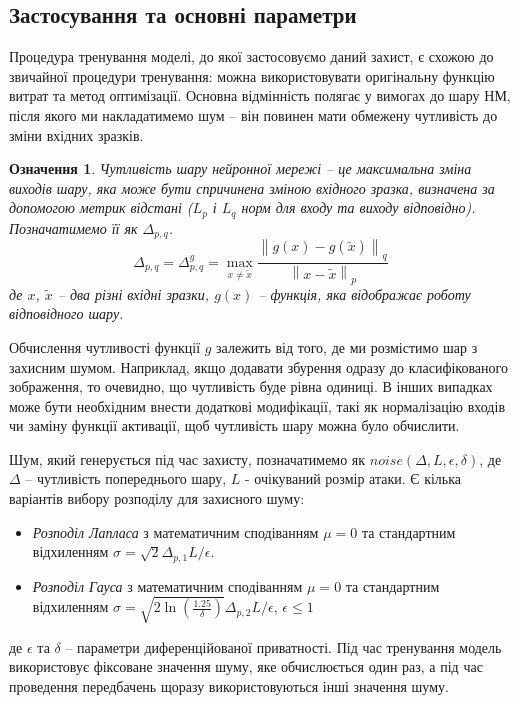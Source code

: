 \documentclass[14pt,a4paper]{extarticle}
\newcounter{e}
\newtheorem{defn}[theorem]{Означення}
\numberwithin{equation}{section}
\numberwithin{figure}{section}
\begin{document}
 \subsection{Застосування та основні параметри}
 Процедура тренування моделі, до якої застосовуємо даний захист, є схожою до звичайної процедури тренування: можна використовувати оригінальну функцію витрат та метод оптимізації. Основна відмінність полягає у вимогах до шару НМ, після якого ми накладатимемо шум -- він повинен мати обмежену чутливість до зміни вхідних зразків.
 
 \begin{defn} Чутливість шару нейронної мережі -- це максимальна зміна виходів шару, яка може бути спричинена зміною вхідного зразка, визначена за допомогою метрик відстані ($L_p$ і $L_q$ норм для входу та виходу відповідно). Позначатимемо її як $\Delta_{p, q}$.
 \begin{equation}
 	\label{sensitivity}
 	\Delta_{p, q}=\Delta_{p, q}^{g}=\max _{x \neq \tilde{x}} \frac{\left\|g(x)-g\left(\tilde{x}\right)\right\|_{q}}{\left\|x-\tilde{x}\right\|_{p}}
 \end{equation}
 де $x$, $\tilde{x}$ -- два різні вхідні зразки, $g(x)$ -- функція, яка відображає роботу відповідного шару.
 \end{defn}
 
 Обчислення чутливості функції $g$ залежить від того, де ми розмістимо шар з захисним шумом. Наприклад, якщо додавати збурення одразу до класифікованого зображення, то очевидно, що чутливість буде рівна одиниці. В інших випадках може бути необхідним внести додаткові модифікації, такі як нормалізацію входів чи заміну функції активації, щоб чутливість шару можна було обчислити.
 
 Шум, який генерується під час захисту, позначатимемо як $noise(\Delta, L, \epsilon, \delta)$, де $\Delta$ -- чутливість попереднього шару, $L$ - очікуваний розмір атаки. Є кілька варіантів вибору розподілу для захисного шуму:
 \begin{itemize}
 	\item \textit{Розподіл Лапласа} з математичним сподіванням $\mu = 0$ та стандартним відхиленням $\sigma=\sqrt{2} \Delta_{p, 1} L / \epsilon$. 
 	\item \textit{Розподіл Гауса} з математичним сподіванням $\mu = 0$ та стандартним відхиленням $\sigma=\sqrt{2 \ln \left(\frac{1.25}{\delta}\right)} \Delta_{p, 2} L / \epsilon$, $\epsilon \leq 1$
 \end{itemize}
 де $\epsilon$ та $\delta$ -- параметри диференційованої приватності. Під час тренування модель використовує фіксоване значення шуму, яке обчислюється один раз, а під час проведення передбачень щоразу використовуються інші значення шуму.
 
\end{document}
